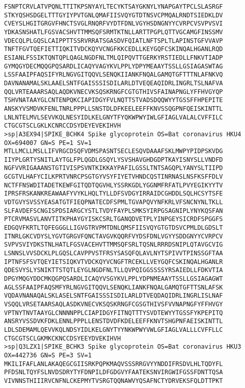 \begin{lstlisting}
FSNPTCRVLATVPQNLTTITKPSNYAYLTECYKTSAYGKNYLYNAPGAYTPCLSLASRGF
STKYQSHSDGELTTTGYIYPVTGNLQMAFIISVQYGTDTNSVCPMQALRNDTSIEDKLDV
CVEYSLHGITGRGVFHNCTSVGLRNQRFVYDTFDNLVGYHSDNGNYYCVRPCVSVPVSVI
YDKASNSHATLFGSVACSHVTTMMSQFSRMTKTNLLARTTPGPLQTTVGCAMGFINSSMV
VDECQLPLGQSLCAIPPTTSSRVRRATSGASDVFQIATLNFTSPLTLAPINSTGFVVAVP
TNFTFGVTQEFIETTIQKITVDCKQYVCNGFKKCEDLLKEYGQFCSKINQALHGANLRQD
ESIANLFSSIKTQNTQPLQAGLNGDFNLTMLQIPQVTTGERKYRSTIEDLLFNKVTIADP
GYMQGYDECMQQGPQSARDLICAQYVAGYKVLPPLYDPYMEAAYTSSLLGSIAGASWTAG
LSSFAAIPFAQSIFYRLNGVGITQQVLSENQKIIANKFNQALGAMQTGFTTTNLAFNKVQ
DAVNANAMALSKLAAELSNTFGAISSSISDILARLDTVEQEAQIDRLINGRLTSLNAFVA
QQLVRTEAAARSAQLAQDKVNECVKSQSKRNGFCGTGTHIVSFAINAPNGLYFFHVGYQP
TSHVNATAAYGLCNTENPQKCIAPIDGYFVLNQTTSTVADSDQQWYYTGSSFFHPEPITE
ANSKYVSMDVKFENLTNRLPPPLLSNSTDLDFKEELEEFFKNVSSQGPNFQEISKINTTL
LNLNTELMVLSEVVKQLNESYIDLKELGNYTFYQKWPWYIWLGFIAGLVALALCVFFILC
CTGCGTSCLGKLKCNRCCDSYDEYEVEKIHVH
>sp|A3EX94|SPIKE_BCHK4 Spike glycoprotein OS=Bat coronavirus HKU4 OX=694007 GN=S PE=1 SV=1
MTLLMCLLMSLLIFVRGCDSQFVDMSPASNTSECLESQVDAAAFSKLMWPYPIDPSKVDG
IIYPLGRTYSNITLAYTGLFPLQGDLGSQYLYSVSHAVGHDGDPTKAYISNYSLLVNDFD
NGFVVRIGAAANSTGTIVISPSVNTKIKKAYPAFILGSSLTNTSAGQPLYANYSLTIIPD
GCGTVLHAFYCILKPRTVNRCPSGTGYVSYFIYETVHNDCQSTINRNASLNSFKSFFDLV
NCTFFNSWDITADETKEWFGITQDTQGVHLYSSRKGDLYGGNMFRFATLPVYEGIKYYTV
IPRSFRSKANKREAWAAFYVYKLHQLTYLLDFSVDGYIRRAIDCGHDDLSQLHCSYTSFE
VDTGVYSVSSYEASATGTFIEQPNATECDFSPMLTGVAPQVYNFKRLVFSNCNYNLTKLL
SLFAVDEFSCNGISPDSIARGCYSTLTVDYFAYPLSMKSYIRPGSAGNIPLYNYKQSFAN
PTCRVMASVLANVTITKPHAYGYISKCSRLTGANQDVETPLYINPGEYSICRDFSPGGFS
EDGQVFKRTLTQFEGGGLLIGVGTRVPMTDNLQMSFIISVQYGTGTDSVCPMLDLGDSLT
ITNRLGKCVDYSLYGVTGRGVFQNCTAVGVKQQRFVYDSFDNLVGYYSDDGNYYCVRPCV
SVPVSVIYDKSTNLHATLFGSVACEHVTTMMSQFSRLTQSNLRRRDSNIPLQTAVGCVIG
LSNNSLVVSDCKLPLGQSLCAVPPVSTFRSYSASQFQLAVLNYTSPIVVTPINSSGFTAA
IPTNFSFSVTQEYIETSIQKVTVDCKQYVCNGFTRCEKLLVEYGQFCSKINQALHGANLR
QDESVYSLYSNIKTTSTQTLEYGLNGDFNLTLLQVPQIGGSSSSYRSAIEDLLFDKVTIA
DPGYMQGYDDCMKQGPQSARDLICAQYVSGYKVLPPLYDPNMEAAYTSSLLGSIAGAGWT
AGLSSFAAIPFAQSMFYRLNGVGITQQVLSENQKLIANKFNQALGAMQTGFTTSNLAFSK
VQDAVNANAQALSKLASELSNTFGAISSSISDILARLDTVEQDAQIDRLINGRLISLNAF
VSQQLVRSETAARSAQLASDKVNECVKSQSKRNGFCGSGTHIVSFVVNAPNGFYFFHVGY
VPTNYTNVTAAYGLCNNNNPPLCIAPIDGYFITNQTTTYSVDTEWYYTGSSFYKPEPITQ
ANSRYVSSDVKFDKLENNLPPPLLENSTDVDFKDELEEFFKNVTSHGPNFAEISKINTTL
LDLSDEMAMLQEVVKQLNDSYIDLKELGNYTYYNKWPWYVWLGFIAGLVALLLCVFFLLC
CTGCGTSCLGKMKCKNCCDSYEEYDVEKIHVH
>sp|Q3LZX1|SPIKE_BCHK3 Spike glycoprotein OS=Bat coronavirus HKU3 OX=442736 GN=S PE=3 SV=1
MKILIFAFLANLAKAQEGCGIISRKPQPKMAQVSSSRRGVYYNDDIFRSDVLHLTQDYFL
PFDSNLTQYFSLNVDSDRYTYFDNPILDFGDGVYFAATEKSNVIRGWIFGSSFDNTTQSA
VIVNNSTHIIIRVCNFNLCKEPMYTVSRGTQQNAWVYQSAFNCTYDRVEKSFQLDTTPKT

\end{lstlisting}
